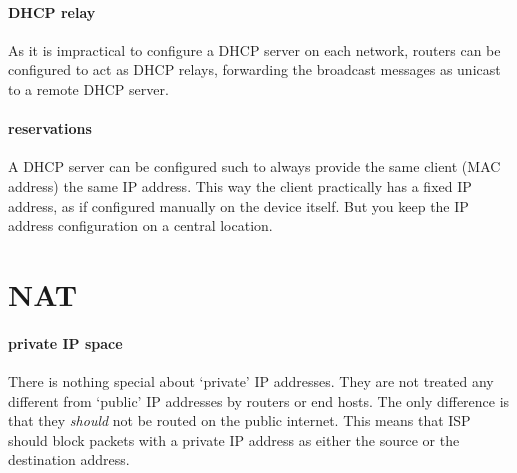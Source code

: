 \paragraph{\acs{DHCP} relay}
As it is impractical to configure a \acs{DHCP} server on each network, routers can be configured to act as \acs{DHCP} relays, forwarding the broadcast messages as unicast to a remote \acs{DHCP} server.

\paragraph{reservations}
A \acs{DHCP} server can be configured such to always provide the same client (\acs{MAC} address) the same \acs{IP} address.
This way the client practically has a fixed \acs{IP} address, as if configured manually on the device itself.
But you keep the \acs{IP} address configuration on a central location.




\section{\Acl{NAT}}
\label{sec:ip-nat}


\paragraph{private \acs{IP} space}
There is nothing special about `private' \acs{IP} addresses.
They are not treated any different from `public' \acs{IP} addresses by routers or end hosts.
The only difference is that they \emph{should} not be routed on the public internet.
This means that \acl{ISP} should block packets with a private \acs{IP} address as either the source or the destination address.

